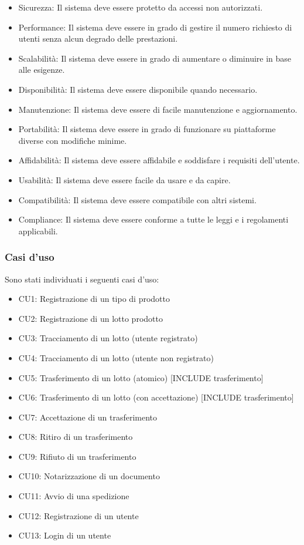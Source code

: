\documentclass[a4paper,11pt]{article}
\begin{document}
\begin{itemize}
  \item Sicurezza: Il sistema deve essere protetto da accessi non autorizzati.
  \item Performance: Il sistema deve essere in grado di gestire il numero richiesto di utenti senza alcun degrado delle prestazioni.
  \item Scalabilità: Il sistema deve essere in grado di aumentare o diminuire in base alle esigenze.
  \item Disponibilità: Il sistema deve essere disponibile quando necessario.
  \item Manutenzione: Il sistema deve essere di facile manutenzione e aggiornamento.
  \item Portabilità: Il sistema deve essere in grado di funzionare su piattaforme diverse con modifiche minime.
  \item Affidabilità: Il sistema deve essere affidabile e soddisfare i requisiti dell'utente.
  \item Usabilità: Il sistema deve essere facile da usare e da capire.
  \item Compatibilità: Il sistema deve essere compatibile con altri sistemi.
  \item Compliance: Il sistema deve essere conforme a tutte le leggi e i regolamenti applicabili.
\end{itemize}

\subsubsection{Casi d'uso}
Sono stati individuati i seguenti casi d'uso:

\begin{itemize}
  \item CU1: Registrazione di un tipo di prodotto
  \item CU2: Registrazione di un lotto prodotto
  \item CU3: Tracciamento di un lotto (utente registrato)
  \item CU4: Tracciamento di un lotto (utente non registrato)
  \item CU5: Trasferimento di un lotto (atomico) [INCLUDE trasferimento]
  \item CU6: Trasferimento di un lotto (con accettazione) [INCLUDE trasferimento]
  \item CU7: Accettazione di un trasferimento
  \item CU8: Ritiro di un trasferimento
  \item CU9: Rifiuto di un trasferimento
  \item CU10: Notarizzazione di un documento
  \item CU11: Avvio di una spedizione
  \item CU12: Registrazione di un utente
  \item CU13: Login di un utente
\end{itemize}
\end{document}
